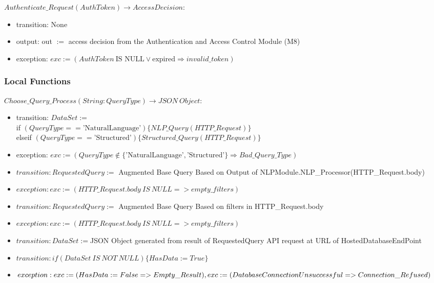 \documentclass[12pt, titlepage]{article}
\begin{document}
\noindent $Authenticate\_Request(AuthToken) \rightarrow AccessDecision$:
\begin{itemize}
\item transition: None
\item output: out $:=$ access decision from the Authentication and Access Control Module (M8)
\item exception: $exc := (AuthToken~\text{IS NULL} \lor \text{expired} \Rightarrow invalid\_token)$
\end{itemize}




\subsubsection{Local Functions}

\par{$Choose\_Query\_Process(String: QueryType) \rightarrow JSON~Object$: }
\begin{itemize}
  \item transition: $DataSet := $ \\
  if $(QueryType == \text{'NaturalLanguage'}) \{NLP\_Query(HTTP\_Request)\}$ \\
  elseif $(QueryType == \text{'Structured'}) \{Structured\_Query(HTTP\_Request)\}$
  \item exception: $exc := (QueryType \notin \{\text{'NaturalLanguage'}, \text{'Structured'}\} \Rightarrow Bad\_Query\_Type)$
\end{itemize}

\begin{itemize}
  \item{$transition: RequestedQuery := $ Augmented Base Query Based on Output of NLPModule.NLP\_Processor(HTTP\_Request.body)}
  \item{$exception: exc := (HTTP\_Request.body~IS~NULL => empty\_filters)$}
\end{itemize}

\begin{itemize}
  \item{$transition: RequestedQuery := $ Augmented Base Query Based on filters in HTTP\_Request.body}
  \item{$exception: exc := (HTTP\_Request.body~IS~NULL => empty\_filters)$}
\end{itemize}

\begin{itemize}
  \item{$transition: DataSet := $JSON Object generated from result of RequestedQuery API request at URL of HostedDatabaseEndPoint}
  \item{$transition: if(DataSet~IS~NOT~NULL) \{HasData := True\}$}
  \item{$exception: exc := ( HasData := False => Empty\_Result), exc := \\ (Database Connection Unsuccessful => Connection\_Refused)$}

\end{itemize}
\end{document}
